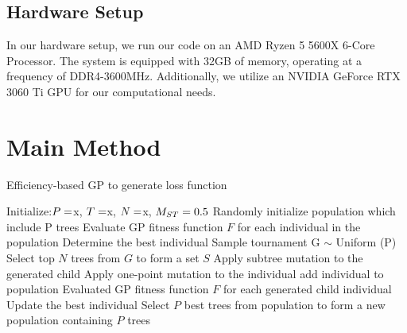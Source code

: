 \begin{ZhChapter}
\subsection{Hardware Setup}
In our hardware setup, we run our code on an AMD Ryzen 5 5600X 6-Core Processor. The system is equipped with 32GB of memory, operating at a frequency of DDR4-3600MHz. Additionally, we utilize an NVIDIA GeForce RTX 3060 Ti GPU for our computational needs.

\section{Main Method}

\begin{algorithm}
\caption{Efficiency-based GP to generate loss function}\label{alg:cap}
\begin{algorithmic}
    \State Initialize:$P = \space $x, $T =\space $x, $N = \space $x, $M_{ST} = \space0.5$
    \State Randomly initialize population which include P trees
    \State Evaluate GP fitness function $F$ for each individual in the population
    \State Determine the best individual
        \State Sample tournament G $\sim$ Uniform (P)
        \State Select top $N$ trees from $G$ to form a set $S$
                \State Apply subtree mutation to the generated child
            \Else
                \State Apply one-point mutation to the individual
            \EndIf
                \State add individual to population
            \EndIf
        \EndFor
        \State Evaluated GP fitness function $F$ for each generated child individual
        \State Update the best individual
        \State Select $P$ best trees from population to form a new population containing $P$ trees
    \EndWhile
\end{algorithmic}
\end{algorithm}



\end{ZhChapter}
